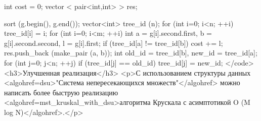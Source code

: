 int cost = 0;
vector < pair<int,int> > res;

sort (g.begin(), g.end());
vector<int> tree_id (n);
for (int i=0; i<n; ++i)
	tree_id[i] = i;
for (int i=0; i<m; ++i)
{
	int a = g[i].second.first,  b = g[i].second.second,  l = g[i].first;
	if (tree_id[a] != tree_id[b])
	{
		cost += l;
		res.push_back (make_pair (a, b));
		int old_id = tree_id[b],  new_id = tree_id[a];
		for (int j=0; j<n; ++j)
			if (tree_id[j] == old_id)
				tree_id[j] = new_id;
	}
}</code>
<h3>Улучшенная реализация</h3>
<p>С использованием структуры данных <algohref=dsu>"Система непересекающихся множеств"</algohref> можно написать более быструю реализацию <algohref=mst_kruskal_with_dsu>алгоритма Крускала с асимптотикой O (M log N)</algohref>.</p>